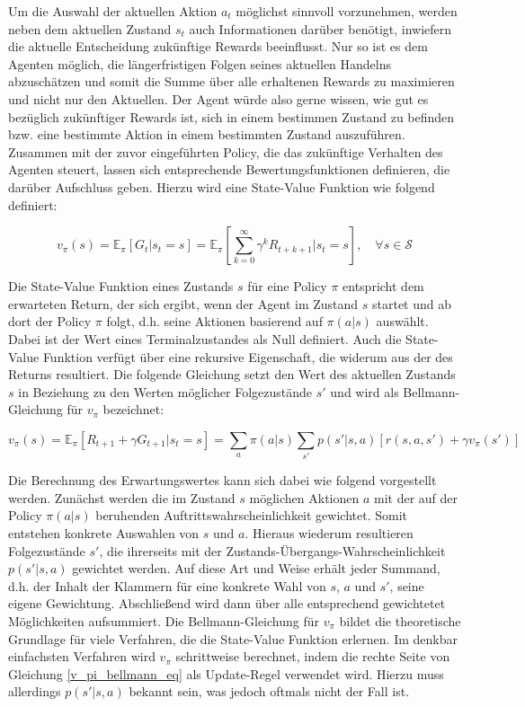Um die Auswahl der aktuellen Aktion $a_t$ möglichst sinnvoll vorzunehmen, werden neben dem aktuellen Zustand $s_t$ auch Informationen darüber benötigt, inwiefern die aktuelle Entscheidung zukünftige Rewards beeinflusst. Nur so ist es dem Agenten möglich, die längerfristigen Folgen seines aktuellen Handelns abzuschätzen und somit die Summe über alle erhaltenen Rewards zu maximieren und nicht nur den Aktuellen. Der Agent würde also gerne wissen, \glqq wie gut \grqq{} es bezüglich zukünftiger Rewards ist, sich in einem bestimmen Zustand zu befinden bzw. eine bestimmte Aktion in einem bestimmten Zustand auszuführen. Zusammen mit der zuvor eingeführten Policy, die das zukünftige Verhalten des Agenten steuert, lassen sich entsprechende Bewertungsfunktionen definieren, die darüber Aufschluss geben. Hierzu wird eine State-Value Funktion wie folgend definiert:

\begin{equation*}
  v_\pi(s) = \mathbb{E}_\pi[G_t|s_t=s] = \mathbb{E}_\pi[\sum_{k=0}^{\infty} \gamma^k R_{t+k+1} | s_t=s], \quad \forall s \in \mathcal{S}
  \label{v_pi_eq}
\end{equation*}

Die State-Value Funktion eines Zustands $s$ für eine Policy $\pi$ entspricht dem erwarteten Return, der sich ergibt, wenn der Agent im Zustand $s$ startet und ab dort der Policy $\pi$ folgt, d.h. seine Aktionen basierend auf $\pi(a|s)$ auswählt. Dabei ist der Wert eines Terminalzustandes als Null definiert. Auch die State-Value Funktion verfügt über eine rekursive Eigenschaft, die widerum aus der des Returns resultiert. Die folgende Gleichung setzt den Wert des aktuellen Zustands $s$ in Beziehung zu den Werten möglicher Folgezustände $s'$ und wird als Bellmann-Gleichung für $v_\pi$ bezeichnet:

\begin{equation}
  v_\pi(s) = \mathbb{E}_\pi[R_{t+1} + \gamma G_{t+1} | s_t=s] = \sum_{a} \pi(a|s) \sum_{s'} p(s'|s,a) [r(s,a,s') + \gamma v_\pi(s')]
  \label{v_pi_bellmann_eq}
\end{equation}

Die Berechnung des Erwartungswertes kann sich dabei wie folgend vorgestellt werden. Zunächst werden die im Zustand $s$ möglichen Aktionen $a$ mit der auf der Policy $\pi(a|s)$ beruhenden Auftrittswahrscheinlichkeit gewichtet. Somit entstehen konkrete Auswahlen von $s$ und $a$. Hieraus wiederum resultieren Folgezustände $s'$, die ihrerseits mit der Zustands-Übergangs-Wahrscheinlichkeit $p(s'|s,a)$ gewichtet werden. Auf diese Art und Weise erhält jeder Summand, d.h. der Inhalt der Klammern für eine konkrete Wahl von $s$, $a$ und $s'$, seine eigene Gewichtung. Abschließend wird dann über alle entsprechend gewichtetet Möglichkeiten aufsummiert. Die Bellmann-Gleichung für $v_\pi$ bildet die theoretische Grundlage für viele Verfahren, die die State-Value Funktion erlernen. Im denkbar einfachsten Verfahren wird $v_\pi$ schrittweise berechnet, indem die rechte Seite von Gleichung \eqref{v_pi_bellmann_eq} als Update-Regel verwendet wird. Hierzu muss allerdings $p(s'|s,a)$ bekannt sein, was jedoch oftmals nicht der Fall ist. \\

